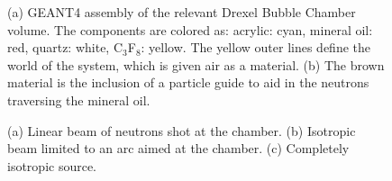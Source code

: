\documentclass[%
12pt,
twoside,
reprint,
amsmath,amssymb,
aps,
]{article}
\begin{document}
\begin{figure}[H]
		\caption{\label{tab:table-name} (a) GEANT4 assembly of the relevant Drexel Bubble Chamber volume. The components are colored as: acrylic: cyan, mineral oil: red, quartz: white, C$_{3}$F$_{8}$: yellow. The yellow outer lines define the world of the system, which is given air as a material. (b) The brown material is the inclusion of a particle guide to aid in the neutrons traversing the mineral oil.}%
	\end{figure}

	\begin{figure}[H]%
		\centering
		\qquad
		\qquad
		\caption{\label{tab:table-name} (a) Linear beam of neutrons shot at the chamber. (b) Isotropic beam limited to an arc aimed at the chamber. (c) Completely isotropic source.}%
	\end{figure}
\end{document}
